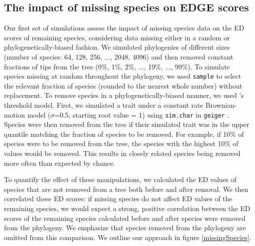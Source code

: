 \documentclass[10pt,english]{article}
\begin{document}
\subsection*{The impact of missing species on EDGE scores}
Our first set of simulations assess the impact of missing species data on the ED
scores of remaining species, considering data missing either in a random or
phylogenetically-biased fashion. We simulated phylogenies of different sizes
(number of species: 64, 128, 256, ..., 2048, 4096) and then removed constant
fractions of tips from the tree (0\%, 1\%, 2\%, ..., 19\%, ..., 99\%). To
simulate species missing at random throughout the phylogeny,
we used \texttt{sample} to select the relevant fraction of
species (rounded to the nearest whole number) without replacement. To remove
species in a phylogenetically-biased manner, we used
\textcite{Felsenstein2005}'s threshold model. First, we simulated a trait under
a constant rate Brownian-motion model ($\sigma$=0.5, starting root value = 1)
using \texttt{sim.char} in \texttt{geiger} 
\autocite{Pennell2014}. Species were then removed from the tree if their
simulated trait was in the upper quantile matching the fraction of species to be
removed. For example, if 10\% of species were to be removed from the tree,
the species with the highest 10\% of values would be removed. This
results in closely related species being removed more often than expected by chance.

To quantify the effect of these manipulations, we calculated the ED values of
species that are not removed from a tree both before and after removal.
We then correlated these ED scores: if missing species do not affect ED
values of the remaining species, we would expect a strong, positive correlation between the ED scores
of the remaining species calculated before and after species were removed from the phylogeny. We emphasize that
species removed from the phylogeny are omitted from this comparison. We outline
our approach in figure \ref{missingSpecies}.
\end{document}
